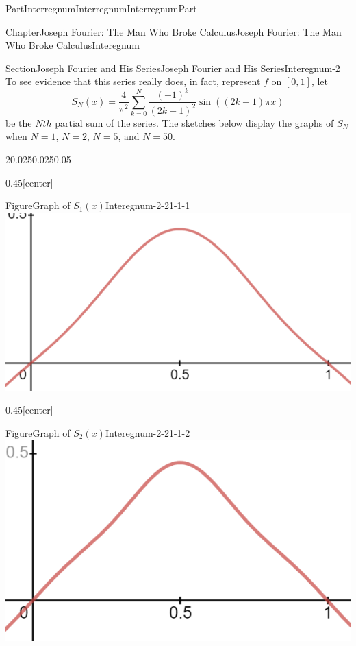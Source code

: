 \documentclass[oneside,10pt,]{book}
\numberwithin{equation}{part}
\begin{document}
\begin{partptx}{Part}{Interregnum}{}{Interregnum}{}{}{InterregnumPart}
\begin{chapterptx}{Chapter}{Joseph Fourier: The Man Who Broke Calculus}{}{Joseph Fourier: The Man Who Broke Calculus}{}{}{Interegnum}
\begin{sectionptx}{Section}{Joseph Fourier and His Series}{}{Joseph Fourier and His Series}{}{}{Interegnum-2}
To see evidence that this series really does, in fact, represent \(f\) on \([0,1]\), let%
\begin{equation*}
S_N(x)=\frac{4}{\pi^2}\sum_{k=0}^N\frac{\left(-1\right)^k}{\left(2k+1\right)^2} \sin\left(\left(2k+1\right)\pi x\right)
\end{equation*}
be the \(Nth\) partial sum of the series.     The sketches below display the graphs of \(S_N\) when \(N=1\), \(N=2\), \(N=5\), and \(N=50\).%
\begin{sidebyside}{2}{0.025}{0.025}{0.05}%
\begin{sbspanel}{0.45}[center]%
\begin{panelfigureptx}{Figure}{Graph of \(S_1(x)\)}{Interegnum-2-21-1-1}{}%
\noindent\includegraphics[width=\linewidth]{external/images/FourierEx2-1.png}
\tcblower
\end{panelfigureptx}%
\end{sbspanel}%
\begin{sbspanel}{0.45}[center]%
\begin{panelfigureptx}{Figure}{Graph of \(S_2(x)\)}{Interegnum-2-21-1-2}{}%
\noindent\includegraphics[width=\linewidth]{external/images/FourierEx3-1.png}

\end{panelfigureptx}
\end{sbspanel}
\end{sidebyside}
\end{sectionptx}
\end{chapterptx}
\end{partptx}
\end{document}
